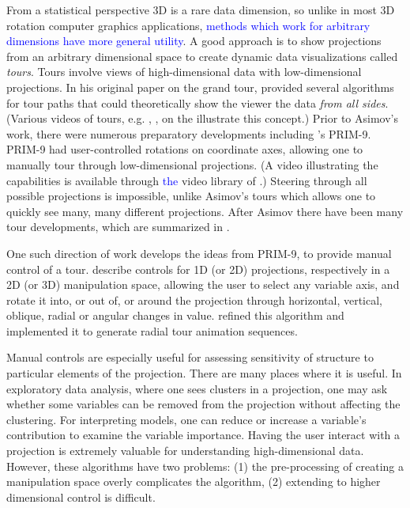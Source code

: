 \documentclass[]{interact}
\theoremstyle{plain}%
\theoremstyle{definition}
\theoremstyle{remark}
\begin{document}
From a statistical perspective 3D is a rare data dimension, so unlike in
most 3D rotation computer graphics applications,
\textcolor{blue}{methods which work for arbitrary dimensions have more general utility}.
A good approach is to show projections from an arbitrary dimensional
space to create dynamic data visualizations called \emph{tours}. Tours
involve views of high-dimensional data with low-dimensional projections.
In his original paper on the grand tour, \citet{As85} provided several
algorithms for tour paths that could theoretically show the viewer the
data \emph{from all sides}. (Various videos of tours, e.g.
\citet{dataviewer}, \citet{gt-pp-video}, on the \citet{ASA22} illustrate
this concept.) Prior to Asimov's work, there were numerous preparatory
developments including \citet{tukey}'s PRIM-9. PRIM-9 had
user-controlled rotations on coordinate axes, allowing one to manually
tour through low-dimensional projections. (A video \citep{PRIM9-video}
illustrating the capabilities is available through \textcolor{blue}{the}
video library of \citet{ASA22}.) Steering through all possible
projections is impossible, unlike Asimov's tours which allows one to
quickly see many, many different projections. After Asimov there have
been many tour developments, which are summarized in \citet{lee2021}.

One such direction of work develops the ideas from PRIM-9, to provide
manual control of a tour. \citet{cook_manual_1997} describe controls for
1D (or 2D) projections, respectively in a 2D (or 3D) manipulation space,
allowing the user to select any variable axis, and rotate it into, or
out of, or around the projection through horizontal, vertical, oblique,
radial or angular changes in value. \citet{spyrison_spinifex_2020}
refined this algorithm and implemented it to generate radial tour
animation sequences.

Manual controls are especially useful for assessing sensitivity of
structure to particular elements of the projection. There are many
places where it is useful. In exploratory data analysis, where one sees
clusters in a projection, one may ask whether some variables can be
removed from the projection without affecting the clustering. For
interpreting models, one can reduce or increase a variable's
contribution to examine the variable importance. Having the user
interact with a projection is extremely valuable for understanding
high-dimensional data. However, these algorithms have two problems: (1)
the pre-processing of creating a manipulation space overly complicates
the algorithm, (2) extending to higher dimensional control is difficult.
\end{document}
